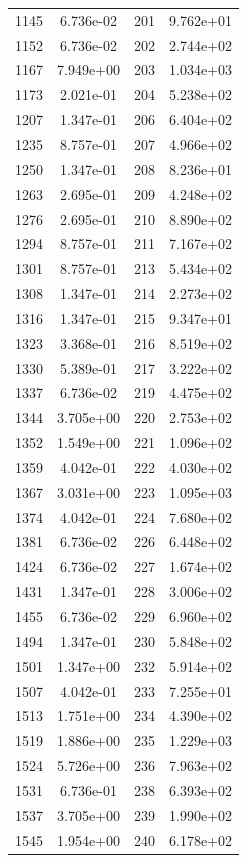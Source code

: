 \documentclass[12pt]{article}
\begin{document}
\begin{longtable}{@{}cccc@{}}
1145 & 6.736e-02 & 201 & 9.762e+01 \\
1152 & 6.736e-02 & 202 & 2.744e+02 \\
1167 & 7.949e+00 & 203 & 1.034e+03 \\
1173 & 2.021e-01 & 204 & 5.238e+02 \\
1207 & 1.347e-01 & 206 & 6.404e+02 \\
1235 & 8.757e-01 & 207 & 4.966e+02 \\
1250 & 1.347e-01 & 208 & 8.236e+01 \\
1263 & 2.695e-01 & 209 & 4.248e+02 \\
1276 & 2.695e-01 & 210 & 8.890e+02 \\
1294 & 8.757e-01 & 211 & 7.167e+02 \\
1301 & 8.757e-01 & 213 & 5.434e+02 \\
1308 & 1.347e-01 & 214 & 2.273e+02 \\
1316 & 1.347e-01 & 215 & 9.347e+01 \\
1323 & 3.368e-01 & 216 & 8.519e+02 \\
1330 & 5.389e-01 & 217 & 3.222e+02 \\
1337 & 6.736e-02 & 219 & 4.475e+02 \\
1344 & 3.705e+00 & 220 & 2.753e+02 \\
1352 & 1.549e+00 & 221 & 1.096e+02 \\
1359 & 4.042e-01 & 222 & 4.030e+02 \\
1367 & 3.031e+00 & 223 & 1.095e+03 \\
1374 & 4.042e-01 & 224 & 7.680e+02 \\
1381 & 6.736e-02 & 226 & 6.448e+02 \\
1424 & 6.736e-02 & 227 & 1.674e+02 \\
1431 & 1.347e-01 & 228 & 3.006e+02 \\
1455 & 6.736e-02 & 229 & 6.960e+02 \\
1494 & 1.347e-01 & 230 & 5.848e+02 \\
1501 & 1.347e+00 & 232 & 5.914e+02 \\
1507 & 4.042e-01 & 233 & 7.255e+01 \\
1513 & 1.751e+00 & 234 & 4.390e+02 \\
1519 & 1.886e+00 & 235 & 1.229e+03 \\
1524 & 5.726e+00 & 236 & 7.963e+02 \\
1531 & 6.736e-01 & 238 & 6.393e+02 \\
1537 & 3.705e+00 & 239 & 1.990e+02 \\
1545 & 1.954e+00 & 240 & 6.178e+02 \\

\end{longtable}
\end{document}

